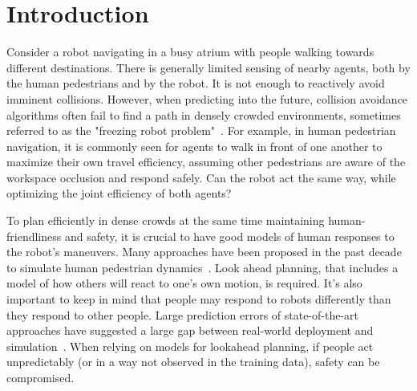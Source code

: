 \documentclass[conference]{IEEEtran}
\begin{document}

\section{Introduction}
\vspace{-0.3em}
\label{sec:intro}
\noindent

Consider a robot navigating in a busy atrium with people walking towards 
different destinations. There is generally limited sensing of nearby agents, 
both by the human pedestrians and by the robot. It is not enough to reactively 
avoid imminent collisions. However, when predicting into the future, 
collision avoidance algorithms often fail to find a path in 
densely crowded environments, sometimes referred to as the "freezing robot 
problem"~\cite{trautman2010unfreezing}. For example, in human pedestrian 
navigation, it is commonly seen for agents to walk in front of one 
another to maximize their own travel efficiency, assuming other pedestrians 
are aware of the workspace occlusion and respond safely. Can the robot act 
the same way, while optimizing the joint efficiency of both agents?  

To plan efficiently in dense crowds at the same time maintaining 
human-friendliness and safety, it is crucial to have good models of human 
responses to the robot's maneuvers. Many approaches have been proposed in the 
past decade to simulate human pedestrian dynamics~\cite{lamarche2004crowd, 
karamouzas2009predictive}.
Look ahead planning, that includes a model of how others will react to one's 
own motion, is required. It's also important to keep in mind that people may 
respond to robots differently than they respond to other people. Large 
prediction errors of state-of-the-art approaches have suggested a large gap 
between real-world deployment and 
simulation~\cite{trautman2015robot,pfeiffer2016predicting}. When 
relying on models for lookahead planning, if people act unpredictably (or in a 
way not observed in the training data), safety can be compromised. 
\end{document}
